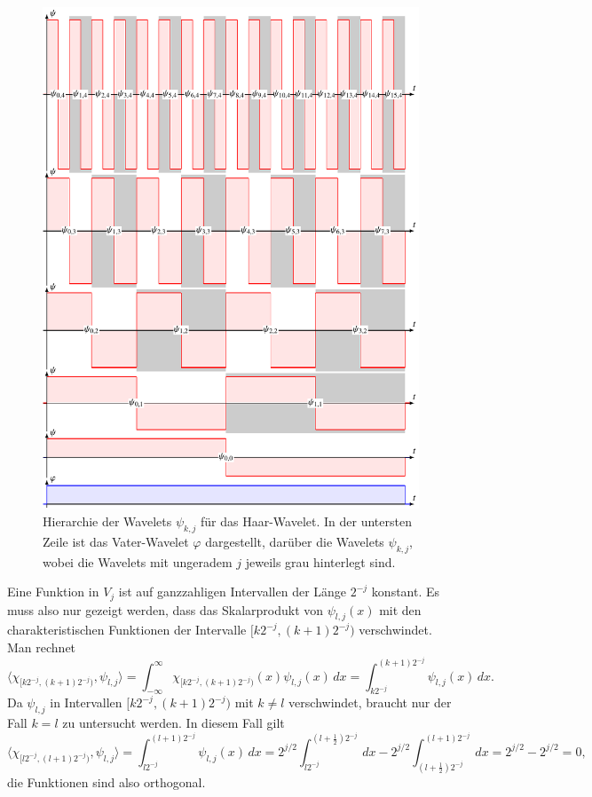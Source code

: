 \begin{figure}
\centering
\includegraphics{chapters/3-haar/images/wavelets.pdf}
\caption{Hierarchie der Wavelets $\psi_{k,j}$ für das Haar-Wavelet.
In der untersten Zeile ist das Vater-Wavelet $\varphi$ dargestellt,
darüber die Wavelets $\psi_{k,j}$, wobei die Wavelets mit ungeradem
$j$ jeweils grau hinterlegt sind.
\label{haar:allwavelets:image}}
\end{figure}

Eine Funktion in $V_j$ ist auf ganzzahligen Intervallen der Länge
$2^{-j}$ konstant.
Es muss also nur gezeigt werden, dass das Skalarprodukt von $\psi_{l,j}(x)$
mit den charakteristischen Funktionen der Intervalle $[k2^{-j},(k+1)2^{-j})$
verschwindet.
Man rechnet
\[
\langle \chi_{[k2^{-j},(k+1)2^{-j})},\psi_{l,j}\rangle
=
\int_{-\infty}^\infty \chi_{[k2^{-j},(k+1)2^{-j})}(x) \psi_{l,j}(x)\,dx
=
\int_{k2^{-j}}^{(k+1)2^{-j}} \psi_{l,j}(x)\,dx.
\]
Da $\psi_{l,j}$ in Intervallen $[k2^{-j},(k+1)2^{-j})$ mit
$k\ne l$ verschwindet, braucht nur der Fall $k=l$ zu untersucht werden.
In diesem Fall gilt
\[
\langle \chi_{[l2^{-j},(l+1)2^{-j})},\psi_{l,j}\rangle
=
\int_{l2^{-j}}^{(l+1)2^{-j}} \psi_{l,j}(x)\,dx
=
2^{j/2}
\int_{l2^{-j}}^{(l+\frac12)2^{-j}} \,dx
-
2^{j/2}
\int_{(l+\frac12)2^{-j}}^{(l+1)2^{-j}} \,dx
=
2^{j/2}
-
2^{j/2}
=
0,
\]
die Funktionen sind also orthogonal.


